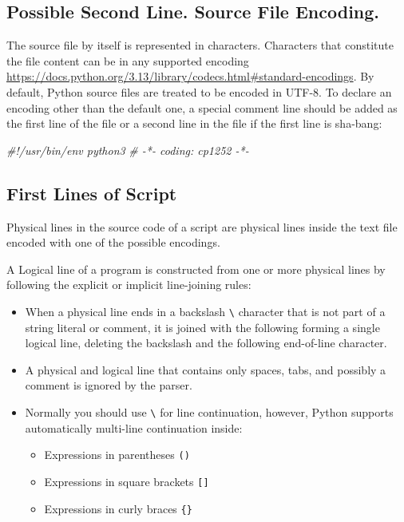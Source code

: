 \documentclass[
]{article}
\newenvironment{Shaded}{}{}
\newcommand{\CommentTok}[1]{\textcolor[rgb]{0.38,0.63,0.69}{\textit{#1}}}
\begin{document}
\hypertarget{possible-second-line-source-file-encoding}{%
\subsection{Possible Second Line. Source File
Encoding.}\label{possible-second-line-source-file-encoding}}

The source file by itself is represented in characters. Characters that
constitute the file content can be in any supported encoding
\url{https://docs.python.org/3.13/library/codecs.html\#standard-encodings}.
By default, Python source files are treated to be encoded in UTF-8. To
declare an encoding other than the default one, a special comment line
should be added as the first line of the file or a second line in the
file if the first line is sha-bang:

\begin{Shaded}
\begin{Highlighting}[]
\CommentTok{\#!/usr/bin/env python3}
\CommentTok{\# {-}*{-} coding: cp1252 {-}*{-}}
\end{Highlighting}
\end{Shaded}

\hypertarget{first-lines-of-script}{%
\subsection{First Lines of Script}\label{first-lines-of-script}}

Physical lines in the source code of a script are physical lines inside
the text file encoded with one of the possible encodings.

A Logical line of a program is constructed from one or more physical
lines by following the explicit or implicit line-joining rules:

\begin{itemize}
\item
  When a physical line ends in a backslash \texttt{\textbackslash{}}
  character that is not part of a string literal or comment, it is
  joined with the following forming a single logical line, deleting the
  backslash and the following end-of-line character.
\item
  A physical and logical line that contains only spaces, tabs, and
  possibly a comment is ignored by the parser.
\item
  Normally you should use \texttt{\textbackslash{}} for line
  continuation, however, Python supports automatically multi-line
  continuation inside:

  \begin{itemize}
  \item
    Expressions in parentheses \texttt{()}
  \item
    Expressions in square brackets \texttt{{[}{]}}
  \item
    Expressions in curly braces \texttt{\{\}}
  \end{itemize}
\end{itemize}
\end{document}
